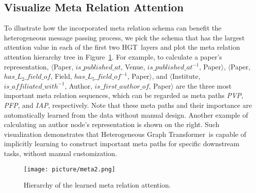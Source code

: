 \documentclass[sigconf]{acmart}
\theoremstyle{definition}
\newcommand{\model}{Heterogeneous Graph Transformer}
\newcommand{\short}{HGT}
\newcommand{\hide}[1]{} \newcommand{\vpara}[1]{\vspace{0.05in}\noindent\textbf{#1 }}
\begin{document}
\subsection{Visualize Meta Relation Attention}
To illustrate how the incorporated meta relation schema can benefit the heterogeneous message passing process, we pick the schema that has the largest attention value in each of the first two \short\ layers and plot the meta relation attention hierarchy tree in Figure~\ref{fig:meta}. 
For example, to calculate a paper's representation, 
$\langle$Paper, $is\_published\_at$, Venue, $is\_published\_at^{-1}$, Paper$\rangle$, 
$\langle$Paper, $has\_L_2\_field\_of$, Field, $has\_L_5\_field\_of^{-1}$, Paper$\rangle$, 
and $\langle$Institute, $is\_affiliated\_with^{-1}$, Author, $is\_first\_author\_of$, Paper$\rangle$
are the three most important meta relation sequences, which can be regarded as meta paths \textit{PVP, PFP,} and \textit{IAP}, respectively. 
Note that these meta paths and their importance are automatically learned from the data without manual design.  
Another example of calculating an author node's representation is shown on the right. 
Such visualization demonstrates that \model\ is capable of implicitly learning to construct important meta paths for specific downstream tasks, without manual customization.

\hide{
 \begin{figure}[t!]
    \centering
        \texttt{[image: picture/meta.png]}
    \caption{Hierarchy tree of learned meta relation attention.}
    \label{fig:meta}
\end{figure} 

}


 \begin{figure}[t!]
    \centering
        \texttt{[image: picture/meta2.png]}
    \caption{Hierarchy of the learned meta relation attention.}
    \label{fig:meta}
    \vspace{-0.3cm}
\end{figure} 
\end{document}

